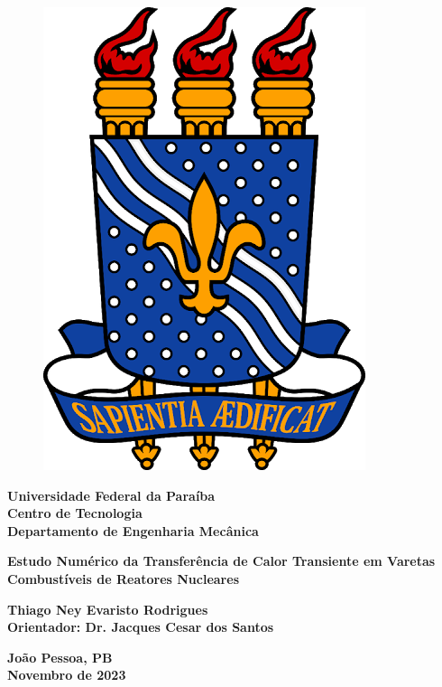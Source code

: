 \begin{titlepage}
    \begin{center}
        \begin{figure}[H]
            \centering
            \includegraphics[scale=0.125]{figures/others/ufpb.png}
        \end{figure}
        
        {\large
        \textbf{Universidade Federal da Paraíba \\
        Centro de Tecnologia \\
        Departamento de Engenharia Mecânica \\}}
        
        \vspace{5cm}
        
        {\Large
        \textbf{Estudo Numérico da Transferência de Calor Transiente em Varetas Combustíveis de Reatores Nucleares}}
        
        \vspace{5cm}
        
        {\large
        \textbf{
        Thiago Ney Evaristo Rodrigues \\
        Orientador: Dr. Jacques Cesar dos Santos \\}}
        
        \vspace{3cm}
        
        {\large
        \textbf{
        João Pessoa, PB \\
        Novembro de 2023 \\}}
    \end{center}
\end{titlepage}